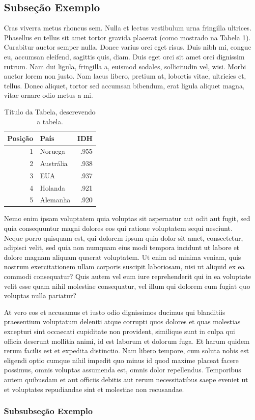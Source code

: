 \subsection{Subseção Exemplo}
Cras viverra metus rhoncus sem. Nulla et lectus vestibulum urna fringilla ultrices. Phasellus eu tellus sit amet tortor gravida placerat (como mostrado na Tabela \ref{tab:tabela1}). Curabitur auctor semper nulla. Donec varius orci eget risus. Duis nibh mi, congue eu, accumsan eleifend, sagittis quis, diam. Duis eget orci sit amet orci dignissim rutrum. Nam dui ligula, fringilla a, euismod sodales, sollicitudin vel, wisi. Morbi auctor lorem non justo. Nam lacus libero, pretium at, lobortis vitae, ultricies et, tellus. Donec aliquet, tortor sed accumsan bibendum, erat ligula aliquet magna, vitae ornare odio metus a mi.

\begin{table}[ht]
\centering
\caption{Título da Tabela, descrevendo a tabela.}
\vspace{0.5cm}
\begin{tabular}{r|lr}
 
Posição & País & IDH \\
\hline
1 & Noruega        & .955 \\
2 & Austrália  & .938 \\
3 & EUA            & .937 \\
4 & Holanda        & .921 \\
5 & Alemanha       & .920 
 
\end{tabular}
\label{tab:tabela1}
\end{table}

Nemo enim ipsam voluptatem quia voluptas sit aspernatur aut odit aut fugit, sed quia consequuntur magni dolores eos qui ratione voluptatem sequi nesciunt. Neque porro quisquam est, qui dolorem ipsum quia dolor sit amet, consectetur, adipisci velit, sed quia non numquam eius modi tempora incidunt ut labore et dolore magnam aliquam quaerat voluptatem. Ut enim ad minima veniam, quis nostrum exercitationem ullam corporis suscipit laboriosam, nisi ut aliquid ex ea commodi consequatur? Quis autem vel eum iure reprehenderit qui in ea voluptate velit esse quam nihil molestiae consequatur, vel illum qui dolorem eum fugiat quo voluptas nulla pariatur?

At vero eos et accusamus et iusto odio dignissimos ducimus qui blanditiis praesentium voluptatum deleniti atque corrupti quos dolores et quas molestias excepturi sint occaecati cupiditate non provident, similique sunt in culpa qui officia deserunt mollitia animi, id est laborum et dolorum fuga. Et harum quidem rerum facilis est et expedita distinctio. Nam libero tempore, cum soluta nobis est eligendi optio cumque nihil impedit quo minus id quod maxime placeat facere possimus, omnis voluptas assumenda est, omnis dolor repellendus. Temporibus autem quibusdam et aut officiis debitis aut rerum necessitatibus saepe eveniet ut et voluptates repudiandae sint et molestiae non recusandae.

\subsubsection{Subsubseção Exemplo}
